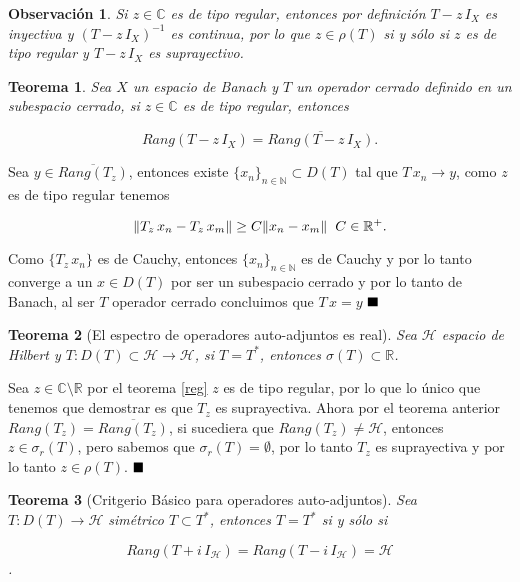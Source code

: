 \documentclass[letterpaper]{report}
\newtheorem{teorema}{Teorema}[chapter]
\newtheorem{obs}{Observaci\'on}
\newcommand{\nat}{\ensuremath{ \mathbb N }}
\newcommand{\co}{\ensuremath{\mathbb C }}
\newcommand{\hil}{\ensuremath{\mathcal H }}
\newcommand{\re}{\ensuremath{\mathbb R }}
\newcommand{\qed}{\ensuremath{\hspace*{0em plus 1fill}\blacksquare}}
\begin{document}
\begin{obs}
Si $z\in\co$ es de tipo regular, entonces por definición $T-z\,I_X$ es inyectiva y $(T-z\,I_X)^{-1}$ es continua, por lo que $z\in\rho(T)$ si y sólo si $z$ es de tipo regular y $T-z\,I_X$ es suprayectivo.
\end{obs}

\begin{teorema}\label{rang-closed}
Sea $X$ un espacio de Banach y $T$ un operador cerrado definido en un subespacio cerrado, si $z\in\co$ es de tipo regular, entonces

$$Rang(T-z\,I_X)=\overline{Rang(T-z\,I_X)}.$$
\end{teorema}

\begin{dem}
Sea $y\in\overline{Rang(T_z)}$, entonces existe $\lbrace x_n\rbrace_{n\in\nat}\subset D(T)$ tal que \hbox{$T\,x_n\rightarrow y$}, como $z$ es de tipo regular tenemos

$$
\Vert T_z\,x_n-T_z\,x_m\Vert\geq C\Vert x_n-x_m\Vert
\hspace{0.2cm}C\in\re^+.
$$ 

Como $\lbrace T_z\,x_n\rbrace$ es de Cauchy, entonces $\lbrace x_n\rbrace_{n\in\nat}$ es de Cauchy y por lo tanto converge a un $x\in D(T)$ por ser un subespacio cerrado y por lo tanto de Banach, al ser $T$ operador cerrado concluimos que $T\,x=y$ \qed
\end{dem}

\begin{teorema}[El espectro de operadores auto-adjuntos es real]\label{real-spec}
Sea $\hil$ espacio de Hilbert y $T:D(T)\subset\hil\rightarrow\hil$, si $T=T^*$, entonces $\sigma(T)\subset\re$.
\end{teorema}

\begin{dem}
Sea $z\in\co\setminus\re$ por el teorema \ref{reg} $z$ es de tipo regular, por lo que lo único que tenemos que demostrar es que $T_z$ es suprayectiva. Ahora por el teorema anterior $Rang(T_z)=\overline{Rang(T_z)}$, si sucediera que $Rang(T_z)\neq\hil$, entonces $z\in\sigma_r(T)$, pero sabemos que $\sigma_r(T)=\emptyset$, por lo tanto $T_z$ es suprayectiva y por lo tanto $z\in\rho(T).$ \qed
\end{dem}

\begin{teorema}[Critgerio Básico para operadores auto-adjuntos]\label{ind-auto-adj}
Sea $T:D(T)\rightarrow\hil$ simétrico $T\subset T^*$, entonces $T=T^*$ si y sólo si 

$$Rang(T+i\,I_{\hil})=Rang(T-i\,I_{\hil})=\hil$$.
\end{teorema}
\end{document}
